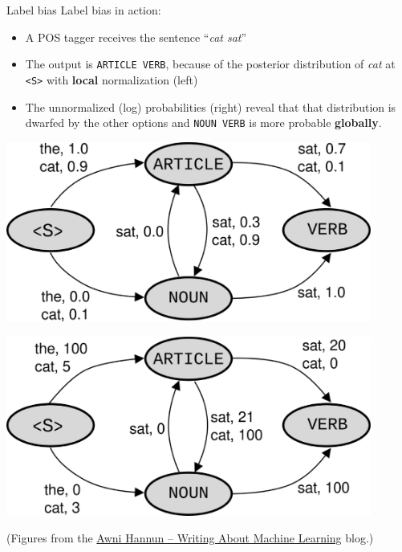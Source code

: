 \documentclass[style=upen, size=14pt]{powerdot}
\theoremstyle{definition}
\begin{document}
  \begin{slide}[toc=]{Label bias}
    Label bias in action:
    \begin{small}
      \begin{itemize}
        \item A POS tagger receives the sentence ``\textit{cat sat}''
        \item The output is \texttt{ARTICLE VERB}, because of the
          posterior distribution of \textit{cat} at \texttt{<S>} with
          \textbf{local} normalization (left)
        \item The unnormalized (log) probabilities (right) reveal that that
          distribution is dwarfed by the other options and \texttt{NOUN VERB}
          is more probable \textbf{globally}.
      \end{itemize}
    \end{small}

    \begin{center}
      \begin{minipage}{0.45\textwidth}
        \begin{center}
        \includegraphics[width=0.9\textwidth]{figures/memm_inference_normalized.eps}
        \end{center}
      \end{minipage}\hfill
      \begin{minipage}{0.45\textwidth}
        \begin{center}
        \includegraphics[width=0.9\textwidth]{figures/memm_inference_unnormalized.eps}
        \end{center}
      \end{minipage}

      \footnotesize(Figures from the \href{https://awni.github.io/label-bias/}{Awni Hannun -- Writing About Machine Learning} blog.)
    \end{center}
  \end{slide}
\end{document}
